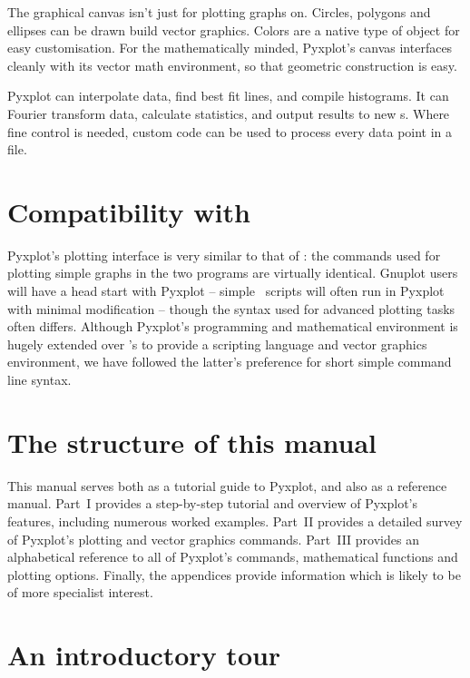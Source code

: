 The graphical canvas isn't just for plotting graphs on. Circles, polygons and
ellipses can be drawn build vector graphics. Colors are a native type of object
for easy customisation. For the mathematically minded, Pyxplot's canvas
interfaces cleanly with its vector math environment, so that geometric
construction is easy.


Pyxplot can interpolate data, find best fit lines, and compile histograms. It
can Fourier transform data, calculate statistics, and output results to new
\datafile s. Where fine control is needed, custom code can be used to process
every data point in a file.

\section{Compatibility with \gnuplot}

Pyxplot's plotting interface is very similar to that of \gnuplot: the commands
used for plotting simple graphs in the two programs are virtually identical.
Gnuplot users will have a head start with Pyxplot -- simple \gnuplot\ scripts
will often run in Pyxplot with minimal modification -- though the syntax used
for advanced plotting tasks often differs. Although Pyxplot's programming and
mathematical environment is hugely extended over \gnuplot's to provide a
scripting language and vector graphics environment, we have followed the
latter's preference for short simple command line syntax.

\section{The structure of this manual}

This manual serves both as a tutorial guide to Pyxplot, and also as a reference
manual. Part~I provides a step-by-step tutorial and overview of Pyxplot's
features, including numerous worked examples. Part~II provides a detailed
survey of Pyxplot's plotting and vector graphics commands. Part~III provides an
alphabetical reference to all of Pyxplot's commands, mathematical functions and
plotting options.  Finally, the appendices provide information which is likely
to be of more specialist interest.

\section{An introductory tour}

